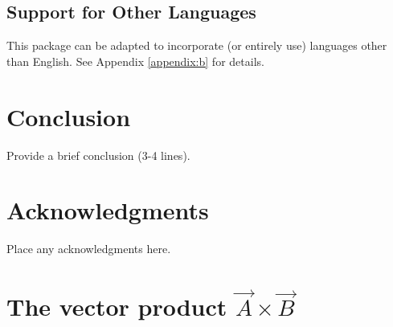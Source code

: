 \documentclass[balance,upint,subscriptcorrection,varvw,mathalfa=cal=boondoxo,spanish,french,vietnamese,russian,greek,pdf-a,colorlinks]{asmeconf}
\begin{document}
\subsection{Support for Other Languages}  This package can be adapted to incorporate (or entirely use) languages other than English. See Appendix \ref{appendix:b} for details.



\section{Conclusion}
Provide a brief conclusion (3-4 lines).



\section*{Acknowledgments}
Place any acknowledgments here.



\nocite{*}%



\appendix


\section[The Vector Product A\times B]{The vector product $\vec{A}\times\vec{B}$}\label{appendix:a}
\end{document}
